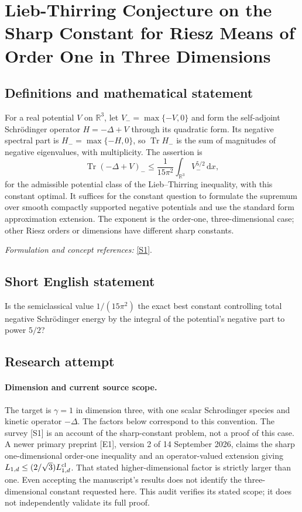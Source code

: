 \documentclass[11pt]{article}
\begin{document}
\section*{\texorpdfstring{Lieb-Thirring Conjecture on the Sharp Constant for Riesz Means of Order One in Three Dimensions}{Lieb-Thirring Conjecture on the Sharp Constant for Riesz Means of Order One in Three Dimensions}}\label{statement}
\subsection{Definitions and mathematical statement}
For a real potential $V$ on ${\mathbb{R}}^3$, let $V_- =\max\{-V,0\}$ and form the self-adjoint Schr\"odinger operator $H=-\Delta+V$ through its quadratic form. Its negative spectral part is $H_-=\max\{-H,0\}$, so $\operatorname{Tr}H_-$ is the sum of magnitudes of negative eigenvalues, with multiplicity. The assertion is
\[
 \operatorname{Tr}(-\Delta+V)_-\le
 \frac1{15\pi^2}\int_{{\mathbb{R}}^3}V_-^{5/2}{\,\mathrm{d}} x,
\]
for the admissible potential class of the Lieb--Thirring inequality, with this constant optimal. It suffices for the constant question to formulate the supremum over smooth compactly supported negative potentials and use the standard form approximation extension. The exponent is the order-one, three-dimensional case; other Riesz orders or dimensions have different sharp constants.
\par\smallskip\textit{Formulation and concept references:} \href{https://arxiv.org/abs/2007.09326}{[S1]}.

\subsection{Short English statement}
Is the semiclassical value $1/(15\pi^2)$ the exact best constant controlling total negative Schr\"odinger energy by the integral of the potential's negative part to power $5/2$?
\subsection{Research attempt}
\paragraph{Dimension and current source scope.}
The target is $\gamma=1$ in dimension three, with one scalar
Schrodinger species and kinetic operator $-\Delta$. The factors
below correspond to this convention. The survey [S1] is an account
of the sharp-constant problem, not a proof of this case. A newer
primary preprint [E1], version 2 of 14 September 2026, claims the
sharp one-dimensional order-one inequality and an operator-valued
extension giving $L_{1,d}\leq(2/\sqrt3)L_{1,d}^{\rm cl}$. That
stated higher-dimensional factor is strictly larger than one.
Even accepting the manuscript's results does not identify the
three-dimensional constant requested here. This audit verifies its
stated scope; it does not independently validate its full proof.
\end{document}
